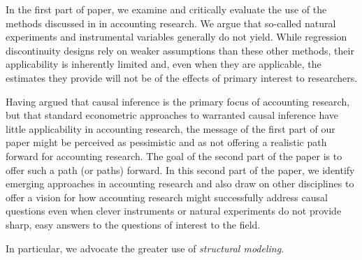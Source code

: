In the first part of paper, we examine and critically evaluate the use of the methods discussed in \cite{Angrist:2010jv} in accounting research. We argue that so-called natural experiments and instrumental variables generally do not yield.
While regression discontinuity designs rely on weaker assumptions than these other methods, their applicability is inherently limited and, even when they are applicable, the estimates they provide will not be of the effects of primary interest to researchers.

Having argued that causal inference is the primary focus of accounting research, but that standard econometric approaches to warranted causal inference have little applicability in accounting research, the message of the first part of our paper might be perceived as pessimistic and as not offering a realistic path forward for accounting research. 
The goal of the second part of the paper is to offer such a path (or paths) forward. 
In this second part of the paper, we identify emerging approaches in accounting research and also draw on other disciplines to offer a vision for how accounting research might successfully address causal questions even when clever instruments or natural experiments do not provide sharp, easy answers to the questions of interest to the field.

In particular, we advocate the greater use of \emph{structural modeling}. 

